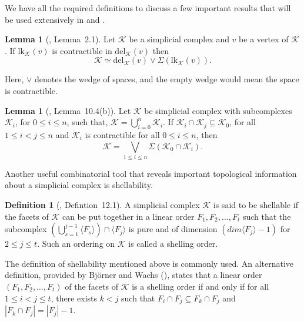 \documentclass[11pt,reqno,a4paper]{amsart}
\theoremstyle{definition}
\newtheorem{definition}{Definition}[section]
\theoremstyle{theorem}
\newtheorem{lemma}[theorem]{Lemma}
\newcommand{\lno}{\left(}
\newcommand{\rno}{\right)}
\newcommand{\lk}{\mathrm{lk}}
\newcommand{\del}{\mathrm{del}}
\theoremstyle{remark}
\begin{document}
We have all the required definitions to discuss a few important results that will be used extensively in  and .

\begin{lemma}[\cite{Matsushitantimes4}, Lemma~2.1]\label{lemma: finding homotopy using link and deletion}
    Let $\mathcal{K}$ be a simplicial complex and $v$ be a vertex of $\mathcal{K}$. If $\lk_{\mathcal{K}}\lno v\rno$ is contractible in $\del_{\mathcal{K}}\lno v\rno$ then $$\mathcal{K} \simeq \del_{\mathcal{K}}\lno v\rno \vee \Sigma\lno \lk_{\mathcal{K}}\lno v\rno\rno.$$
\end{lemma}

Here, $\vee$ denotes the wedge of spaces, and the empty wedge would mean the space is contractible.

\begin{lemma}[\cite{BjornerTopoMethods}, Lemma~10.4(b)]\label{lemma: bjorner's lemma 10.4(b)}
    Let $\mathcal{K}$ be simplicial complex with subcomplexes $\mathcal{K}_i$, for $0\leq i\leq n$, such that, $\mathcal{K} = \bigcup\limits_{i=0}^n \mathcal{K}_i$. If $\mathcal{K}_i \cap \mathcal{K}_j \subseteq \mathcal{K}_0$, for all $1\leq i < j \leq n$ and $\mathcal{K}_i$ is contractible for all $0\leq i \leq n$, then $$\mathcal{K} = \bigvee\limits_{1\leq i \leq n}\Sigma\lno\mathcal{K}_0 \cap \mathcal{K}_i \rno.$$
\end{lemma}

Another useful combinatorial tool that reveals important topological information about a simplicial complex is shellability.

\begin{definition}[\cite{kozlovCombAlgTopo}, Defintion~12.1]\label{def:shellable}
    A simplicial complex $\mathcal{K}$ is said to be shellable if the facets of $\mathcal{K}$ can be put together in a linear order $F_1, F_2, \dots, F_t$ such that the subcomplex $\lno \bigcup_{s=1}^{j-1}\langle F_s \rangle \rno \cap \langle F_j \rangle$ is pure and of dimension $\lno dim \langle F_j \rangle -1 \rno$ for $2 \leq j \leq t$. Such an ordering on $\mathcal{K}$ is called a shelling order.
\end{definition}   
The definition of shellability mentioned above is commonly used. An alternative definition, provided by Bj{\"o}rner and Wachs (\cite[Lemma~2.3]{Bjornershellable}), states that a linear order $\lno F_1, F_2, \ldots, F_t \rno$ of the facets of $\mathcal{K}$ is a shelling order if and only if for all $ 1 \leq i < j \leq t $, there exists $k < j$  such that $F_i \cap F_j \subseteq F_k \cap F_j$ and $|F_k \cap F_j| = |F_j| - 1$.
\end{document}
